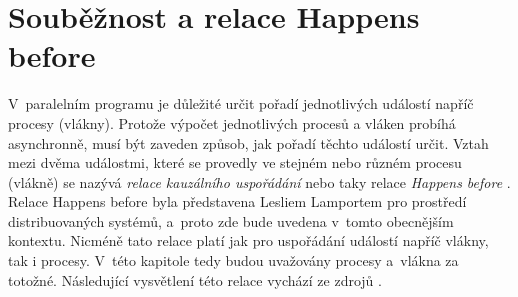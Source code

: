 



\section{Souběžnost a relace Happens before}\label{happens-before}

V~paralelním programu je důležité určit pořadí jednotlivých událostí napříč procesy (vlákny). Protože výpočet jednotlivých procesů a vláken probíhá asynchronně, musí být zaveden způsob, jak pořadí těchto událostí určit. Vztah mezi dvěma událostmi, které se provedly ve stejném nebo různém procesu (vlákně) se nazývá \textit{relace kauzálního uspořádání} nebo taky relace \textit{Happens before} \cite{cite:HB}. Relace Happens before byla představena Lesliem Lamportem pro prostředí distribuovaných systémů, a~proto zde bude uvedena v~tomto obecnějším kontextu. Nicméně tato relace platí jak pro uspořádání událostí napříč vlákny, tak i procesy. V~této kapitole tedy budou uvažovány procesy a~vlákna za totožné. Následující vysvětlení této relace vychází ze zdrojů \cite{cite:HB,cite:PDI}.

